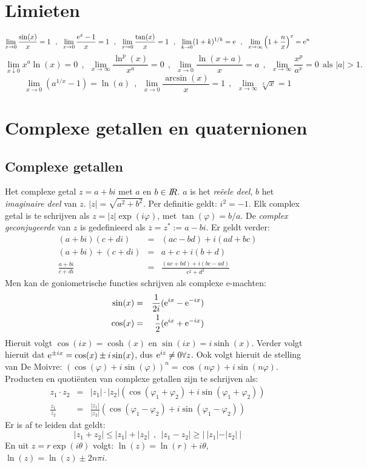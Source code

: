 \section{Limieten}
\[
\lim_{x\rightarrow0}\frac{\sin(x)}{x}=1~~,~~
\lim_{x\rightarrow0}\frac{{\rm e}^x-1}{x}=1~~,~~
\lim_{x\rightarrow0}\frac{\tan(x)}{x}=1~~,~~
\lim_{k\rightarrow0}(1+k)^{1/k}={\rm e}~~,~~
\lim_{x\rightarrow\infty}\left(1+\frac{n}{x}\right)^x={\rm e}^n
\]
\[
\lim_{x\downarrow0}x^a\ln(x)=0~~,~~
\lim_{x\rightarrow\infty}\frac{\ln^p(x)}{x^a}=0~~,~~
\lim_{x\rightarrow0}\frac{\ln(x+a)}{x}=a~~,~~
\lim_{x\rightarrow\infty}\frac{x^p}{a^x}=0~~\mbox{als }|a|>1.
\]
\[
\lim_{x\rightarrow0}\left(a^{1/x}-1\right)=\ln(a)~~,~~
\lim_{x\rightarrow0}\frac{\arcsin(x)}{x}=1~~,~~
\lim_{x\rightarrow\infty}\sqrt[x]{x}=1
\]

\section{Complexe getallen en quaternionen}
\subsection{Complexe getallen}
Het complexe getal $z=a+bi$ met $a$ en $b\in I\hspace{-1mm}R$. $a$ is het {\it re\"eele
deel}, $b$ het {\it imaginaire deel} van $z$. $|z|=\sqrt{a^2+b^2}$. Per
definitie geldt: $i^2=-1$. Elk complex getal is te schrijven als
$z=|z|\exp(i\varphi)$, met $\tan(\varphi)=b/a$. De {\it complex geconjugeerde}
van $z$ is gedefinieerd als $\overline{z}=z^*:=a-bi$. Er geldt verder:
\begin{eqnarray*}
(a+bi)(c+di)&=&(ac-bd)+i(ad+bc)\\
(a+bi)+(c+di)&=&a+c+i(b+d)\\
\frac{a+bi}{c+di}&=&\frac{(ac+bd)+i(bc-ad)}{c^2+d^2}
\end{eqnarray*}
Men kan de goniometrische functies schrijven als complexe e-machten:
\begin{eqnarray*}
\sin(x)&=&\frac{1}{2i}({\rm e}^{ix}-{\rm e}^{-ix})\\
\cos(x)&=&\frac{1}{2}({\rm e}^{ix}+{\rm e}^{-ix})
\end{eqnarray*}
Hieruit volgt $\cos(ix)=\cosh(x)$ en $\sin(ix)=i\sinh(x)$. Verder volgt
hieruit dat ${\rm e}^{\pm ix}=\cos(x)\pm i\sin(x)$, dus
${\rm e}^{iz}\neq0\forall z$. Ook volgt hieruit de stelling van De Moivre:
$(\cos(\varphi)+i\sin(\varphi))^n=\cos(n\varphi)+i\sin(n\varphi)$.
\npar
Producten en quoti\"enten van complexe getallen zijn te schrijven als:
\begin{eqnarray*}
z_1\cdot z_2&=&|z_1|\cdot|z_2|(\cos(\varphi_1+\varphi_2)+i\sin(\varphi_1+\varphi_2))\\
\frac{z_1}{z_2}&=&\frac{|z_1|}{|z_2|}(\cos(\varphi_1-\varphi_2)+i\sin(\varphi_1-\varphi_2))
\end{eqnarray*}
Er is af te leiden dat geldt:
\[
|z_1+z_2|\leq|z_1|+|z_2|~~,~~|z_1-z_2|\geq|~|z_1|-|z_2|~|
\]
En uit $z=r\exp(i\theta)$ volgt: $\ln(z)=\ln(r)+i\theta$, $\ln(z)=\ln(z)\pm2n\pi i$.

